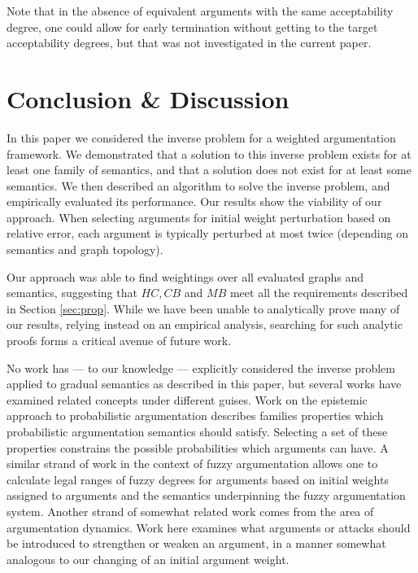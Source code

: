 \documentclass{article}
\begin{document}
Note that in the absence of equivalent arguments with the same acceptability degree, one could allow for early termination without getting to the target acceptability degrees, but that was not investigated in the current paper.

\section{Conclusion \& Discussion} \label{sec:discussion}

In this paper we considered the inverse problem for a weighted argumentation framework. We demonstrated that a solution to this inverse problem exists for at least one family of semantics, and that a solution does not exist for at least some semantics. We then described an algorithm to solve the inverse problem, and empirically evaluated its performance. Our results show the viability of our approach. When selecting arguments for initial weight perturbation based on relative error, each argument is typically perturbed at most twice (depending on semantics and graph topology).

Our approach was able to find weightings over all evaluated graphs and semantics, suggesting that $HC, CB$ and $MB$ meet all the requirements described in Section \ref{sec:prop}. While we have been unable to analytically prove many of our results, relying instead on an empirical analysis, searching for such analytic proofs forms a critical avenue of future work.

No work has --- to our knowledge --- explicitly considered the inverse problem applied to gradual semantics as described in this paper, but several works have examined related concepts under different guises. Work on the epistemic approach to probabilistic argumentation \cite{hunter17probabilistic} describes families properties which probabilistic argumentation semantics should satisfy. Selecting a set of these properties constrains the possible probabilities which arguments can have. A similar strand of work in the context of fuzzy argumentation \cite{wu16fuzzy} allows one to calculate legal ranges of fuzzy degrees for arguments based on initial weights assigned to arguments and the semantics underpinning the fuzzy argumentation system.
%
Another strand of somewhat related work comes from the area of argumentation dynamics. Work here examines what arguments or attacks should be introduced to strengthen or weaken an argument, in a manner somewhat analogous to our changing of an initial argument weight.
\end{document}
